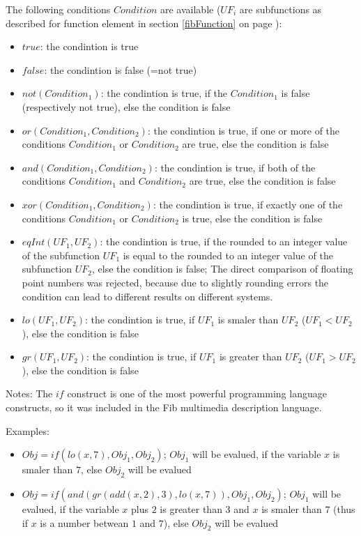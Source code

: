 \bigskip\noindent
The following conditions $Condition$ are available ($UF_i$ are subfunctions as described for function element in section \ref{fibFunction} on page \pageref{fibFunction}):
\begin{itemize}
 \item $true$: the condintion is true
 \item $false$: the condintion is false (=not true)
 \item $not(Condition_1)$: the condintion is true, if the $Condition_1$ is false (respectively not true), else the condition is false
 \item $or( Condition_1, Condition_2)$: the condintion is true, if one or more of the conditions $Condition_1$ or $Condition_2$ are true, else the condition is false
 \item $and( Condition_1, Condition_2)$: the condintion is true, if both of the conditions $Condition_1$ and $Condition_2$ are true, else the condition is false
 \item $xor( Condition_1, Condition_2)$: the condintion is true, if exactly one of the conditions $Condition_1$ or $Condition_2$ is true, else the condition is false

 \item $eqInt(UF_1,UF_2)$: the condintion is true, if the rounded to an integer value of the subfunction $UF_1$ is equal to the rounded to an integer value of the subfunction $UF_2$, else the condition is false; The direct comparison of floating point numbers was rejected, because due to slightly rounding errors the condition can lead to different results on different systems.
 \item $lo(UF_1,UF_2)$: the condintion is true, if $UF_1$ is smaler than $UF_2$ ($UF_1<UF_2$), else the condition is false
 \item $gr(UF_1,UF_2)$: the condintion is true, if $UF_1$ is greater than $UF_2$ ($UF_1>UF_2$), else the condition is false
\end{itemize}


\bigskip\noindent
Notes:
The $if$ construct is one of the most powerful programming language constructs, so it was included in the Fib multimedia description language.

\bigskip\noindent
Examples:
\begin{itemize}
 \item $Obj=if( lo(x,7), Obj_1, Obj_2)$; $Obj_1$ will be evalued, if the variable $x$ is smaler than $7$, else $Obj_2$ will be evalued
 \item $Obj=if( and( gr( add(x, 2), 3), lo(x, 7) ), Obj_1, Obj_2)$; $Obj_1$ will be evalued, if the variable $x$ plus $2$ is greater than $3$ and $x$ is smaler than $7$ (thus if $x$ is a number betwean $1$ and $7$), else $Obj_2$ will be evalued
\end{itemize}

